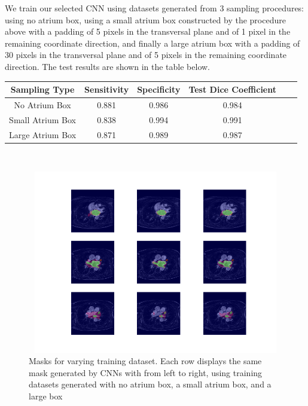 \noindent We train our selected CNN using datasets generated from 3 sampling procedures: using no atrium box, using a small atrium box constructed by the procedure above with a padding of 5 pixels in the transversal plane and of 1 pixel in the remaining coordinate direction, and finally a large atrium box with a padding of 30 pixels in the transversal plane and of 5 pixels in the remaining coordinate direction. The test results are shown in the table below.\\

{
\centering
\begin{tabular}{cccccc}
Sampling Type & Sensitivity & Specificity & Test Dice Coefficient \\ \hline
No Atrium Box                                              & 0.881       & 0.986       & 0.984                                                        \\
Small Atrium Box                                           & 0.838       & 0.994       & 0.991                                                        \\
Large Atrium Box                                           & 0.871       & 0.989       & 0.987                                                       
\end{tabular}\\
\vspace{0.5cm}
}

\begin{figure}
\centering
\includegraphics[trim=2.5cm 1.5cm 2cm 1.5cm, clip=true, height=80mm, width=150mm]{Chapter3/mask_results_varying_training_dataset.png}
\caption{Masks for varying training dataset. Each row displays the same mask generated by CNNs with from left to right, using training datasets generated with no atrium box, a small atrium box, and a large box}
\label{training_dataset}
\end{figure}

